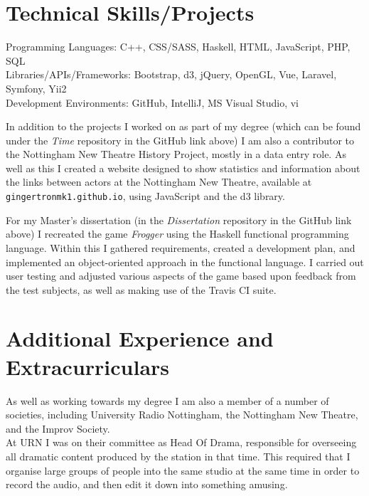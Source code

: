 \documentclass[10pt]{article}
\begin{document}
\section*{Technical Skills/Projects}

Programming Languages: C++, CSS/SASS, Haskell, HTML, JavaScript, PHP, SQL\\
Libraries/APIs/Frameworks: Bootstrap, d3, jQuery, OpenGL, Vue, Laravel, Symfony, Yii2\\
Development Environments: GitHub, IntelliJ, MS Visual Studio, vi

\vskip 5mm

In addition to the projects I worked on as part of my degree (which can be found under the \emph{Time} repository in the GitHub link above) I am also a contributor to the Nottingham New Theatre History Project, mostly in a data entry role.
As well as this I created a website designed to show statistics and information about the links between actors at the Nottingham New Theatre, available at \verb|gingertronmk1.github.io|, using JavaScript and the d3 library.

\par

For my Master's dissertation (in the \emph{Dissertation} repository in the GitHub link above) I recreated the game \emph{Frogger} using the Haskell functional programming language.
Within this I gathered requirements, created a development plan, and implemented an object-oriented approach in the functional language.
I carried out user testing and adjusted various aspects of the game based upon feedback from the test subjects, as well as making use of the Travis CI suite.

\section*{Additional Experience and Extracurriculars}

As well as working towards my degree I am also a member of a number of societies, including University Radio Nottingham, the Nottingham New Theatre, and the Improv Society.\\

At URN I was on their committee as Head Of Drama, responsible for overseeing all dramatic content produced by the station in that time.
This required that I organise large groups of people into the same studio at the same time in order to record the audio, and then edit it down into something amusing.\\
\end{document}
